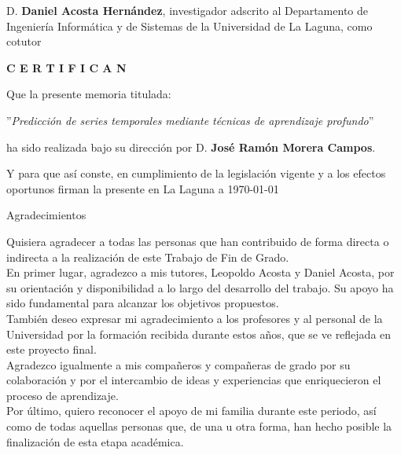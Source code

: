 \documentclass[spanish,a4paper,12pt,oneside]{extreport}
\begin{document}
\bigskip
D. {\bf Daniel Acosta Hernández}, investigador adscrito al Departamento de Ingeniería Informática y de Sistemas de la Universidad de La Laguna, como cotutor\pagestyle{empty}

\bigskip
\bigskip
{\bf C E R T I F I C A N}

\bigskip
\bigskip
Que la presente memoria titulada:

\bigskip
''{\it Predicción de series temporales mediante técnicas de aprendizaje profundo}''

\bigskip
\bigskip
\bigskip

\noindent ha sido realizada bajo su dirección por D. {\bf José Ramón Morera Campos}.

\bigskip
\bigskip

Y para que así conste, en cumplimiento de la legislación vigente y a los efectos
oportunos firman la presente en La Laguna a \today

\newpage
\thispagestyle{empty}

{ \begin{LARGE}
Agradecimientos
\end{LARGE}

\hspace{3mm}

\begin{large}
Quisiera agradecer a todas las personas que han contribuido de forma directa o indirecta a la realización de este Trabajo de Fin de Grado. \\

En primer lugar, agradezco a mis tutores, Leopoldo Acosta y Daniel Acosta, por su orientación y disponibilidad a lo largo del desarrollo del trabajo. 
Su apoyo ha sido fundamental para alcanzar los objetivos propuestos. \\

También deseo expresar mi agradecimiento a los profesores y al personal de la Universidad por la formación recibida durante estos años, que se ve reflejada en este proyecto final. \\

Agradezco igualmente a mis compañeros y compañeras de grado por su colaboración y por el intercambio de ideas y experiencias que enriquecieron el proceso de aprendizaje. \\

Por último, quiero reconocer el apoyo de mi familia durante este periodo, así como de todas aquellas personas que, de una u otra forma, han hecho posible la finalización de esta etapa académica. \\
\end{large}

}
\newpage
\thispagestyle{empty}
\end{document}
